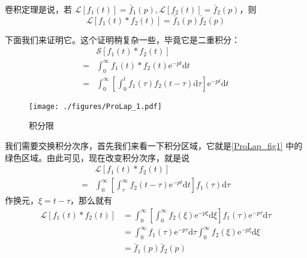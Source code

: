 卷积定理是说，若 $\mathscr L[f_1(t)] = \bar f_1(p), \mathscr L[f_2(t)] = \bar f_2(p)$，则
\begin{equation}
\mathscr L[f_{1}(t) * f_{2}(t) ]= \bar{f}_{1}(p) \bar{f}_{2}(p)
\end{equation}

下面我们来证明它。这个证明稍复杂一些，毕竟它是二重积分：
\begin{equation}
\begin{aligned} & \mathscr{S}\left[f_{1}(t) * f_{2}(t)\right] \\=& \int_{0}^{\infty} f_{1}(t) * f_{2}(t) \mathrm{e}^{-p t} \mathrm{d} t \\=& \int_{0}^{\infty}\left[\int_{0}^{t} f_{1}(\tau) f_{2}(t-\tau) \mathrm{d} \tau\right] \mathrm{e}^{-p t} \mathrm{d} t \end{aligned}
\end{equation}
\begin{figure}[ht]
\centering
\texttt{[image: ./figures/ProLap\_1.pdf]}
\caption{积分限} \label{ProLap_fig1}
\end{figure}
我们需要交换积分次序，首先我们来看一下积分区域，它就是\autoref{ProLap_fig1} 中的绿色区域。由此可见，现在改变积分次序，就是说
\begin{equation}
\begin{aligned} & \mathscr{L}\left[f_{1}(t) * f_{2}(t)\right] \\=& \int_{0}^{\infty}\left[\int_{\tau}^{\infty} f_{2}(t-\tau) \mathrm{e}^{-p t} \mathrm{d} t\right] f_{1}(\tau) \mathrm{d} \tau \end{aligned}
\end{equation}
作换元，$\xi=t-\tau$，那么就有
\begin{equation}
\begin{aligned} \mathscr{L}\left[f_{1}(t) * f_{2}(t)\right] &=\int_{0}^{\infty}\left[\int_{0}^{\infty} f_{2}(\xi) \mathrm{e}^{-p \xi} \mathrm{d} \xi\right] f_{1}(\tau) \mathrm{e}^{-p \tau} \mathrm{d} \tau \\ &=\int_{0}^{\infty} f_{1}(\tau) \mathrm{e}^{-p \tau} \mathrm{d} \tau \int_{0}^{\infty} f_{2}(\xi) \mathrm{e}^{-p \xi} \mathrm{d} \xi \\ &=\bar{f}_{1}(p) \bar{f}_{2}(p) \end{aligned}
\end{equation}

